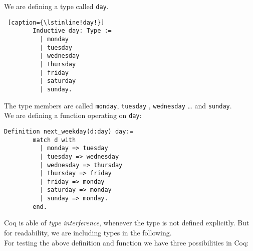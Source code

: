 	  
	  \begin{example}
	  We are defining a type called \lstinline!day!.~\\\vspace{-10mm}
	  {\normalfont \begin{lstlisting} [caption={\lstinline!day!}] 
	    Inductive day: Type :=
		  | monday
		  | tuesday
		  | wednesday
		  | thursday
		  | friday
		  | saturday
		  | sunday.
	  \end{lstlisting}}
	  The type members are called \lstinline!monday!, \lstinline!tuesday! , \lstinline!wednesday! \ldots{} and \lstinline!sunday!.\\
	  We are defining a function operating on \lstinline!day!: 
	  {\normalfont \begin{lstlisting}[caption = {\lstinline! next_weekday!}]
	  Definition next_weekday(d:day) day:=
	    match d with 
		  | monday => tuesday
		  | tuesday => wednesday
		  | wednesday => thursday
		  | thursday => friday
		  | friday => monday
		  | saturday => monday
		  | sunday => monday.
	    end.  
	  \end{lstlisting}}
	  \end{example}
	  Coq is able of {\itshape type  interference}, whenever the type is not defined explicitly.
	  But for readability, we are including types in the following.\\   
	  
	  For testing the above definition and function we have three possibilities in Coq:
	     
